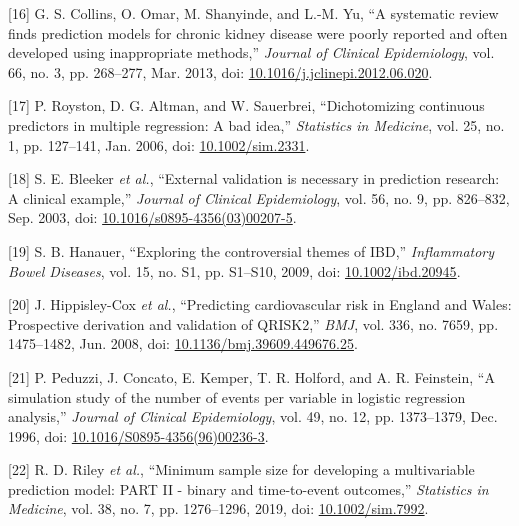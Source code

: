 \documentclass[12pt,PhD,twoside,openright]{muthesis}
\newenvironment{cslreferences}%
  {}%
  {\par}
\begin{document}
\begin{cslreferences}
\leavevmode\hypertarget{ref-collins_systematic_2013}{}%
{[}16{]} G. S. Collins, O. Omar, M. Shanyinde, and L.-M. Yu, ``A systematic review finds prediction models for chronic kidney disease were poorly reported and often developed using inappropriate methods,'' \emph{Journal of Clinical Epidemiology}, vol. 66, no. 3, pp. 268--277, Mar. 2013, doi: \href{https://doi.org/10.1016/j.jclinepi.2012.06.020}{10.1016/j.jclinepi.2012.06.020}.

\leavevmode\hypertarget{ref-royston_dichotomizing_2006}{}%
{[}17{]} P. Royston, D. G. Altman, and W. Sauerbrei, ``Dichotomizing continuous predictors in multiple regression: A bad idea,'' \emph{Statistics in Medicine}, vol. 25, no. 1, pp. 127--141, Jan. 2006, doi: \href{https://doi.org/10.1002/sim.2331}{10.1002/sim.2331}.

\leavevmode\hypertarget{ref-bleeker_external_2003}{}%
{[}18{]} S. E. Bleeker \emph{et al.}, ``External validation is necessary in prediction research: A clinical example,'' \emph{Journal of Clinical Epidemiology}, vol. 56, no. 9, pp. 826--832, Sep. 2003, doi: \href{https://doi.org/10.1016/s0895-4356(03)00207-5}{10.1016/s0895-4356(03)00207-5}.

\leavevmode\hypertarget{ref-hanauer_exploring_2009}{}%
{[}19{]} S. B. Hanauer, ``Exploring the controversial themes of IBD,'' \emph{Inflammatory Bowel Diseases}, vol. 15, no. S1, pp. S1--S10, 2009, doi: \href{https://doi.org/10.1002/ibd.20945}{10.1002/ibd.20945}.

\leavevmode\hypertarget{ref-hippisley-cox_predicting_2008}{}%
{[}20{]} J. Hippisley-Cox \emph{et al.}, ``Predicting cardiovascular risk in England and Wales: Prospective derivation and validation of QRISK2,'' \emph{BMJ}, vol. 336, no. 7659, pp. 1475--1482, Jun. 2008, doi: \href{https://doi.org/10.1136/bmj.39609.449676.25}{10.1136/bmj.39609.449676.25}.

\leavevmode\hypertarget{ref-peduzzi_simulation_1996}{}%
{[}21{]} P. Peduzzi, J. Concato, E. Kemper, T. R. Holford, and A. R. Feinstein, ``A simulation study of the number of events per variable in logistic regression analysis,'' \emph{Journal of Clinical Epidemiology}, vol. 49, no. 12, pp. 1373--1379, Dec. 1996, doi: \href{https://doi.org/10.1016/S0895-4356(96)00236-3}{10.1016/S0895-4356(96)00236-3}.

\leavevmode\hypertarget{ref-riley_minimum_2019}{}%
{[}22{]} R. D. Riley \emph{et al.}, ``Minimum sample size for developing a multivariable prediction model: PART II - binary and time-to-event outcomes,'' \emph{Statistics in Medicine}, vol. 38, no. 7, pp. 1276--1296, 2019, doi: \href{https://doi.org/10.1002/sim.7992}{10.1002/sim.7992}.


\end{cslreferences}
\end{document}
